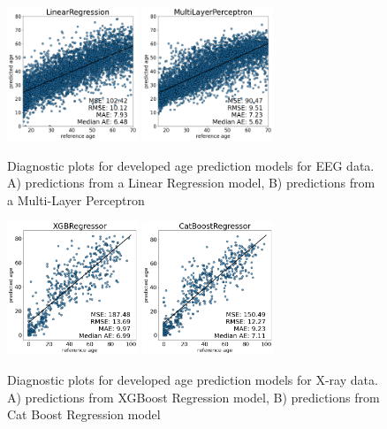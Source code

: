 \documentclass[letterpaper]{article} %
\begin{document}
\begin{figure}
\centering
    \includegraphics[width=0.35\textwidth]{images/linreg_new.png}
    \includegraphics[width=0.35\textwidth]{images/mlp_new.png}
\caption{
Diagnostic plots for developed age prediction models for EEG data. A) predictions from a Linear Regression model, B) predictions from a Multi-Layer Perceptron}
\label{fig:eeg-models}


\centering
    \includegraphics[width=0.35\textwidth]{images/xrayage.png}
    \includegraphics[width=0.35\textwidth]{images/xrayage2.png}
\caption{
Diagnostic plots for developed age prediction models for X-ray data.
A) predictions from XGBoost Regression model, B) predictions from Cat Boost Regression model}
\label{fig:xray-models}
\end{figure}
\end{document}

